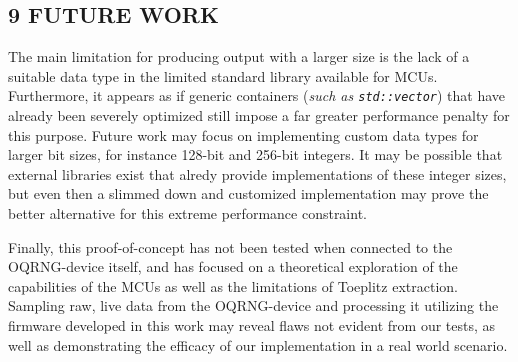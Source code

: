 \documentclass{sigchi}
\begin{document}
\subsection{9 FUTURE WORK}\label{future-work}

The main limitation for producing output with a larger size is the lack of a suitable data type in the limited standard library available for MCUs. Furthermore, it appears as if generic containers (\emph{such as \texttt{std::vector}}) that have already been severely optimized still impose a far greater performance penalty for this purpose. Future work may focus on implementing custom data types for larger bit sizes, for instance 128-bit and 256-bit integers. It may be possible that external libraries exist that alredy provide implementations of these integer sizes, but even then a slimmed down and customized implementation may prove the better alternative for this extreme performance constraint.

Finally, this proof-of-concept has not been tested when connected to the OQRNG-device itself, and has focused on a theoretical exploration of the capabilities of the MCUs as well as the limitations of Toeplitz extraction. Sampling raw, live data from the OQRNG-device and processing it utilizing the firmware developed in this work may reveal flaws not evident from our tests, as well as demonstrating the efficacy of our implementation in a real world scenario.
\balance{}



\end{document}
